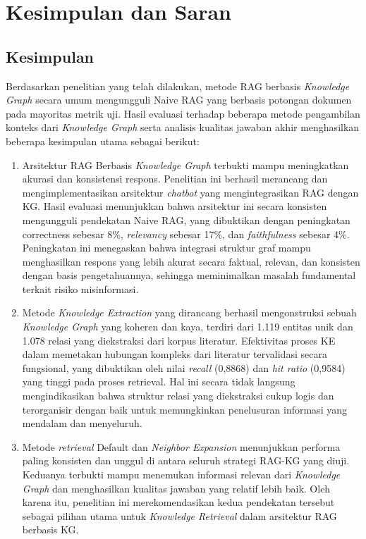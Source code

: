 \chapter{Kesimpulan dan Saran}
\section{Kesimpulan}
Berdasarkan penelitian yang telah dilakukan, metode RAG berbasis \textit{Knowledge Graph} secara umum mengungguli Naive RAG yang berbasis potongan dokumen pada mayoritas metrik uji.
Hasil evaluasi terhadap beberapa metode pengambilan konteks dari \textit{Knowledge Graph} serta analisis kualitas jawaban akhir menghasilkan beberapa kesimpulan utama sebagai berikut:

\begin{enumerate}
      \item Arsitektur RAG Berbasis \textit{Knowledge Graph} terbukti mampu meningkatkan akurasi dan konsistensi respons.
            Penelitian ini berhasil merancang dan mengimplementasikan arsitektur \textit{chatbot} yang mengintegrasikan RAG dengan KG.
            Hasil evaluasi menunjukkan bahwa arsitektur ini secara konsisten mengungguli pendekatan Naive RAG, yang dibuktikan dengan peningkatan \textlatin{correctness} sebesar 8\%, \textit{relevancy} sebesar 17\%, dan \textit{faithfulness} sebesar 4\%.
            Peningkatan ini menegaskan bahwa integrasi struktur graf mampu menghasilkan respons yang lebih akurat secara faktual, relevan, dan konsisten dengan basis pengetahuannya, sehingga meminimalkan masalah fundamental terkait risiko misinformasi.

      \item Metode \textit{Knowledge Extraction} yang dirancang berhasil mengonstruksi sebuah \textit{Knowledge Graph} yang koheren dan kaya, terdiri dari 1.119 entitas unik dan 1.078 relasi yang diekstraksi dari korpus literatur.
            Efektivitas proses KE dalam memetakan hubungan kompleks dari literatur tervalidasi secara fungsional, yang dibuktikan oleh nilai \textit{recall} (0,8868) dan \textit{hit ratio} (0,9584) yang tinggi pada proses retrieval.
            Hal ini secara tidak langsung mengindikasikan bahwa struktur relasi yang diekstraksi cukup logis dan terorganisir dengan baik untuk memungkinkan penelusuran informasi yang mendalam dan menyeluruh.

      \item Metode \textit{retrieval} Default dan \textit{Neighbor Expansion} menunjukkan performa paling konsisten dan unggul di antara seluruh strategi RAG-KG yang diuji.
            Keduanya terbukti mampu menemukan informasi relevan dari \textit{Knowledge Graph} dan menghasilkan kualitas jawaban yang relatif lebih baik.
            Oleh karena itu, penelitian ini merekomendasikan kedua pendekatan tersebut sebagai pilihan utama untuk \textit{Knowledge Retrieval} dalam arsitektur RAG berbasis KG.
\end{enumerate}

